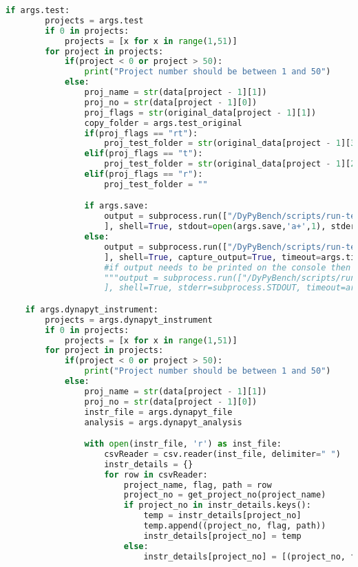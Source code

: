 \begin{lstlisting}[caption=Access Interface of DyPyBench,label=code:dypybench.py,language=Python]
    if args.test:
        projects = args.test
        if 0 in projects:
            projects = [x for x in range(1,51)]
        for project in projects:
            if(project < 0 or project > 50):
                print("Project number should be between 1 and 50")
            else:
                proj_name = str(data[project - 1][1])
                proj_no = str(data[project - 1][0])
                proj_flags = str(original_data[project - 1][1])
                copy_folder = args.test_original
                if(proj_flags == "rt"):
                    proj_test_folder = str(original_data[project - 1][3])
                elif(proj_flags == "t"):
                    proj_test_folder = str(original_data[project - 1][2])
                elif(proj_flags == "r"):
                    proj_test_folder = ""

                if args.save:
                    output = subprocess.run(["/DyPyBench/scripts/run-test.sh %s %s %s %s %s" %(proj_name, proj_no, proj_test_folder, copy_folder, args.timeout)
                    ], shell=True, stdout=open(args.save,'a+',1), stderr=subprocess.STDOUT, timeout=args.timeout)
                else:
                    output = subprocess.run(["/DyPyBench/scripts/run-test.sh %s %s %s %s %s" %(proj_name, proj_no, proj_test_folder, copy_folder, args.timeout)
                    ], shell=True, capture_output=True, timeout=args.timeout)
                    #if output needs to be printed on the console then comment above and uncomment below
                    """output = subprocess.run(["/DyPyBench/scripts/run-test.sh %s %s %s %s %s" %(proj_name, proj_no, proj_test_folder, copy_folder, args.timeout)
                    ], shell=True, stderr=subprocess.STDOUT, timeout=args.timeout)"""

    if args.dynapyt_instrument:
        projects = args.dynapyt_instrument
        if 0 in projects:
            projects = [x for x in range(1,51)]
        for project in projects:
            if(project < 0 or project > 50):
                print("Project number should be between 1 and 50")
            else:
                proj_name = str(data[project - 1][1])
                proj_no = str(data[project - 1][0])
                instr_file = args.dynapyt_file
                analysis = args.dynapyt_analysis

                with open(instr_file, 'r') as inst_file:
                    csvReader = csv.reader(inst_file, delimiter=" ")
                    instr_details = {}
                    for row in csvReader:
                        project_name, flag, path = row
                        project_no = get_project_no(project_name)
                        if project_no in instr_details.keys():
                            temp = instr_details[project_no]
                            temp.append((project_no, flag, path))
                            instr_details[project_no] = temp
                        else:
                            instr_details[project_no] = [(project_no, flag, path)]


\end{lstlisting}
